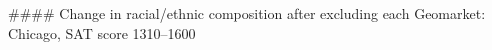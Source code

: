 #### Change in racial/ethnic composition after excluding each Geomarket: Chicago, SAT score 1310–1600
